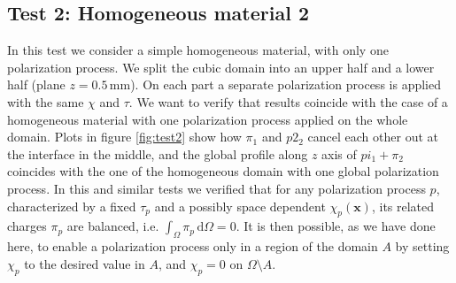 \documentclass[11pt,a4paper]{article}
\begin{document}
\subsection{Test 2: Homogeneous material 2}
In this test we consider a simple homogeneous material, with only one polarization process. We split the cubic domain into an upper half and a lower half (plane \(z=0.5\,\)mm). On each part a separate polarization process is applied with the same \(\chi\) and \(\tau\). We want to verify that results coincide with the case of a homogeneous material with one polarization process applied on the whole domain. Plots in figure \ref{fig:test2} show how \(\pi_1\) and \(p2_2\) cancel each other out at the interface in the middle, and the global profile along \(z\) axis of \(pi_1+\pi_2\) coincides with the one of the homogeneous domain with one global polarization process. In this and similar tests we verified that for any polarization process \(p\), characterized by a fixed \(\tau_p\) and a possibly space dependent \(\chi_p(\mathbf{x})\), its related charges \(\pi_p\) are balanced, i.e. \(\int_{\Omega}\pi_p\,\mathrm{d}\Omega=0\). It is then possible, as we have done here, to enable a polarization process only in a region of the domain \(A\) by setting \(\chi_p\) to the desired value in \(A\), and \(\chi_p = 0\) on \(\Omega\setminus A\).
\end{document}
